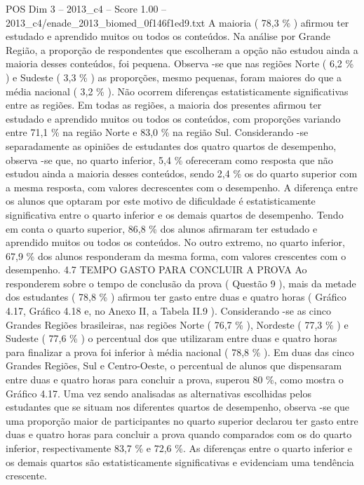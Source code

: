 \begin{textsample}{POS Dim 3 – 2013\_c4 – Score 1.00 – 2013\_c4/enade\_2013\_biomed\_0f146f1ed9.txt}
A maioria ( 78,3 \% ) afirmou ter estudado e aprendido muitos ou todos os conteúdos.
Na análise por Grande Região, a proporção de respondentes que escolheram a opção não estudou ainda a maioria desses conteúdos, foi pequena.
Observa -se que nas regiões Norte ( 6,2 \% ) e Sudeste ( 3,3 \% ) as proporções, mesmo pequenas, foram maiores do que a média nacional ( 3,2 \% ).
Não ocorrem diferenças estatisticamente significativas entre as regiões.
Em todas as regiões, a maioria dos presentes afirmou ter estudado e aprendido muitos ou todos os conteúdos, com proporções variando entre 71,1 \% na região Norte e 83,0 \% na região Sul.
Considerando -se separadamente as opiniões de estudantes dos quatro quartos de desempenho, observa -se que, no quarto inferior, 5,4 \% ofereceram como resposta que não estudou ainda a maioria desses conteúdos, sendo 2,4 \% os do quarto superior com a mesma resposta, com valores decrescentes com o desempenho.
A diferença entre os alunos que optaram por este motivo de dificuldade é estatisticamente significativa entre o quarto inferior e os demais quartos de desempenho.
Tendo em conta o quarto superior, 86,8 \% dos alunos afirmaram ter estudado e aprendido muitos ou todos os conteúdos.
No outro extremo, no quarto inferior, 67,9 \% dos alunos responderam da mesma forma, com valores crescentes com o desempenho. 4.7 TEMPO GASTO PARA CONCLUIR A PROVA Ao responderem sobre o tempo de conclusão da prova ( Questão 9 ), mais da metade dos estudantes ( 78,8 \% ) afirmou ter gasto entre duas e quatro horas ( Gráfico 4.17, Gráfico 4.18 e, no Anexo II, a Tabela II.9 ).
Considerando -se as cinco Grandes Regiões brasileiras, nas regiões Norte ( 76,7 \% ), Nordeste ( 77,3 \% ) e Sudeste ( 77,6 \% ) o percentual dos que utilizaram entre duas e quatro horas para finalizar a prova foi inferior à média nacional ( 78,8 \% ).
Em duas das cinco Grandes Regiões, Sul e Centro-Oeste, o percentual de alunos que dispensaram entre duas e quatro horas para concluir a prova, superou 80 \%, como mostra o Gráfico 4.17.
Uma vez sendo analisadas as alternativas escolhidas pelos estudantes que se situam nos diferentes quartos de desempenho, observa -se que uma proporção maior de participantes no quarto superior declarou ter gasto entre duas e quatro horas para concluir a prova quando comparados com os do quarto inferior, respectivamente 83,7 \% e 72,6 \%.
As diferenças entre o quarto inferior e os demais quartos são estatisticamente significativas e evidenciam uma tendência crescente.

\end{textsample}
